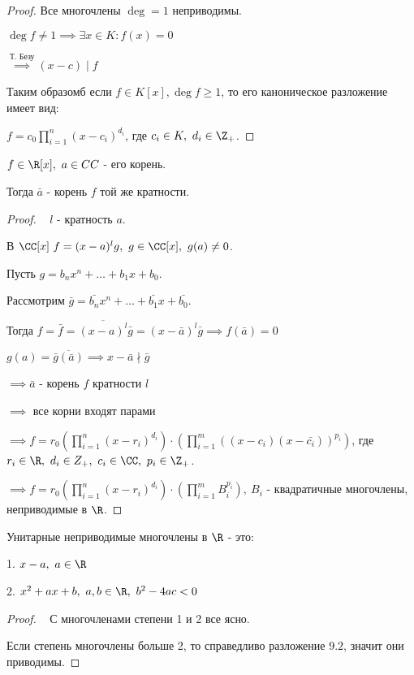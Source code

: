 \begin{proof}
    Все многочлены $\deg = 1$ неприводимы.

    $\deg f \neq 1 \implies \exists x \in K: f(x) = 0$

    $\overset{\text{Т. Безу}}{\implies} (x - c) \mid f$

    Таким образомб если $f \in K[x], \deg f \ge 1$, то его каноническое разложение имеет вид:

    $f = c_0\prod\limits_{i = 1}^n (x - c_i)^{d_i}$, где $c_i \in K,~d_i \in \Z_+$.
\end{proof}

\begin{theorem-non}
    $f \in \R[x],~ a \in CC$ - его корень.

    Тогда $\bar{a}$ - корень $f$ той же кратности.
\end{theorem-non}

\begin{proof}~
    $l$ - кратность $a$.

    В $\CC[x]~f = (x - a)^lg,~ g \in \CC[x],~ g(a) \neq 0$.

    Пусть $g = b_nx^n + \dots + b_1x + b_0$.

    Рассмотрим $\bar{g} = \bar{b_n}x^n + \dots + \bar{b_1}x + \bar{b_0}$.

    Тогда $f = \bar{f} = \overline{(x - a)^l}\bar{g} = (x - \bar{a})^l\bar{g} \implies f(\bar{a}) = 0$

    $g(a) = \overline{\bar{g}(\bar{a})} \implies x - \bar{a} \nmid \bar{g}$

    $\implies \bar{a}$ - корень $f$ кратности $l$

    $\implies$ все корни входят парами

    $\implies f = r_0\left(\prod\limits_{i = 1}^n (x - r_i)^{d_i}\right) \cdot \left(\prod\limits_{i = 1}^m ((x - c_i)(x - \bar{c_i}))^{p_i}\right)$, где $r_i \in \R,~d_i \in Z_+,~c_i \in \CC,~p_i \in \Z_+$.

    $\implies f = r_0\left(\prod\limits_{i = 1}^n (x - r_i)^{d_i}\right) \cdot \left(\prod\limits_{i = 1}^m B_i^{p_i}\right),~ B_i$ - квадратичные многочлены, неприводимые в $\R$.
\end{proof}

\begin{theorem-non}
    Унитарные неприводимые многочлены в $\R$ - это:

    1. $x - a,~ a \in \R$

    2. $x^2 + ax + b,~ a, b \in \R,~ b^2 - 4ac < 0$
\end{theorem-non}

\begin{proof}~
    С многочленами степени 1 и 2 все ясно.

    Если степень многочлены больше 2, то справедливо разложение $9.2$, значит они приводимы.
\end{proof}


